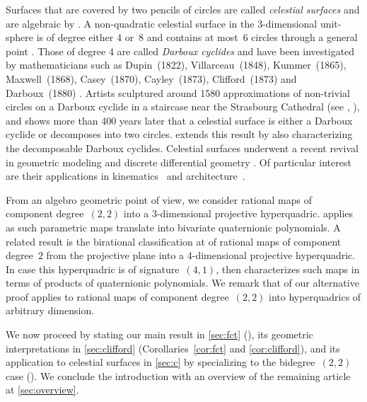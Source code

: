 \documentclass[11pt]{article}
\newcommand{\df}{\emph}
\begin{document}
Surfaces that are covered by two pencils of circles are called \df{celestial surfaces}
and are algebraic by \citep[Theorem~1]{2001}.
A non-quadratic celestial surface in the 3-dimensional unit-sphere
is of degree either 4 or~8
and contains at most~6 circles through a general point \cite{2021circ,1987,1980}.
Those of degree 4 are called \df{Darboux cyclides}
and have been investigated by
mathematicians such as
Dupin~(1822),
Villarceau~(1848),
Kummer~(1865),
Maxwell~(1868),
Casey~(1870),
Cayley~(1873),
Clifford~(1873) and
Darboux~(1880)
\citep[Introduction]{2019mor}.
Artists sculptured around 1580
approximations of non-trivial circles on a Darboux cyclide in a staircase near the Strasbourg Cathedral
(see \cite{2014rt}, \citep[page~101]{2010ber}),
and
\citep[Main~Theorem~1.1]{2018sko} shows
more than 400 years later
that a celestial surface is
either a Darboux cyclide or decomposes into two circles.
 extends this result by also characterizing the decomposable Darboux cyclides.
Celestial surfaces underwent a recent revival in geometric modeling and discrete differential geometry
\cite{1995,2012ort,2014rin,2014bez,2019mor}.
Of particular interest are their applications in
kinematics~\cite{2018kin,2019boh,2020kin} and architecture~\cite{2011arc,2012web}.


From an algebro geometric point of view,
we consider rational maps of component degree~$(2,2)$ into a 3-dimensional projective hyperquadric.
 applies as such parametric maps translate into bivariate quaternionic polynomials.
A related result is the birational classification at \citep[Theorem~3]{2018kol} of
rational maps of component degree~$2$
from the projective plane into a 4-dimensional projective hyperquadric.
In case this hyperquadric is of signature~$(4,1)$, then \citep[Corollary~5.1]{2018sko}
characterizes such maps in terms of products of quaternionic polynomials.
We remark that  of our alternative proof applies to rational maps of component degree~$(2,2)$
into hyperquadrics of arbitrary dimension.

We now proceed by stating our main result in \textsection\ref{sec:fct} (),
its geometric interpretations in \textsection\ref{sec:clifford} (Corollaries~\ref{cor:fct} and \ref{cor:clifford}),
and its application to celestial surfaces in \textsection\ref{sec:c} by specializing
to the bidegree~$(2,2)$ case ().
We conclude the introduction with an overview of the remaining article at \textsection\ref{sec:overview}.
\end{document}
